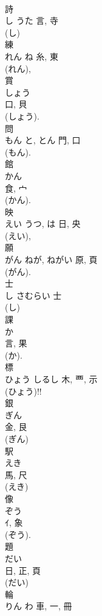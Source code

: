\documentclass[8pt]{extreport}
\begin{document}
\begin{CJK}{UTF8}{min}
\\	詩	
\\	し	うた	言, 寺	
\\	(し) 
\\	練	
\\	れん	ね	糸, 東	
\\	(れん), 
\\	賞	
\\	しょう	
\\	口, 貝		
\\	(しょう). 
\\	問	
\\	もん	と, とん	門, 口	
\\	(もん). 
\\	館	
\\	かん	
\\	食, 宀		
\\	(かん). 
\\	映	
\\	えい	うつ, は	日, 央	
\\	(えい), 
\\	願	
\\	がん	ねが, ねがい	原, 頁	
\\	(がん). 
\\	士	
\\	し	さむらい	士	
\\	(し) 
\\	課	
\\	か	
\\	言, 果	
\\	(か). 
\\	標	
\\	ひょう	しるし	木, 覀, 示	
\\	(ひょう)!!	
\\	銀	
\\	ぎん	
\\	金, 艮	
\\	(ぎん) 
\\	駅	
\\	えき	
\\	馬, 尺	
\\	(えき) 
\\	像	
\\	ぞう	
\\	ｲ, 象	
\\	(ぞう). 
\\	題	
\\	だい	
\\	日, 正, 頁	
\\	(だい) 
\\	輪	
\\	りん	わ	車, 一, 冊		

\end{CJK}
\end{document}
